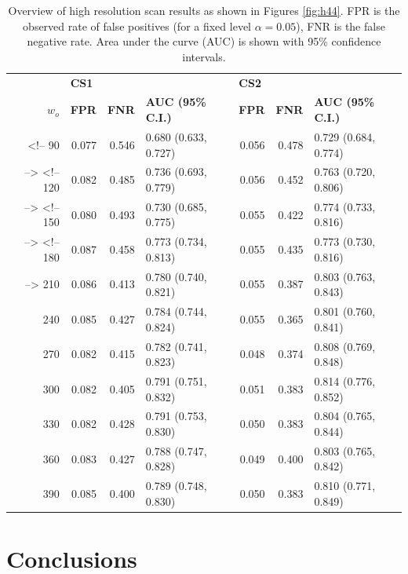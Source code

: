 \documentclass[12pt]{article}
\begin{document}
\begin{table}[hbtp]
\centering
\begin{adjustbox}{max width=\textwidth}
\begin{tabular}{rrrlrrl}
  \hline
  & \multicolumn{3}{l}{\bf CS1} & \multicolumn{3}{l}{\bf CS2} \\
$w_o$ & \bf FPR & \bf FNR & \bf AUC (95\% C.I.) & \bf FPR & \bf FNR & \bf AUC (95\% C.I.) \\  
  \hline
<!-- 90 & 0.077 & 0.546 & 0.680 (0.633, 0.727) & 0.056 & 0.478 & 0.729 (0.684, 0.774) \\  -->
<!--   120 & 0.082 & 0.485 & 0.736 (0.693, 0.779) & 0.056 & 0.452 & 0.763 (0.720, 0.806) \\  -->
<!--   150 & 0.080 & 0.493 & 0.730 (0.685, 0.775) & 0.055 & 0.422 & 0.774 (0.733, 0.816) \\  -->
<!--   180 & 0.087 & 0.458 & 0.773 (0.734, 0.813) & 0.055 & 0.435 & 0.773 (0.730, 0.816) \\  -->
  210 & 0.086 & 0.413 & 0.780 (0.740, 0.821) & 0.055 & 0.387 & 0.803 (0.763, 0.843) \\ 
  240 & 0.085 & 0.427 & 0.784 (0.744, 0.824) & 0.055 & 0.365 & 0.801 (0.760, 0.841) \\ 
  270 & 0.082 & 0.415 & 0.782 (0.741, 0.823) & 0.048 & 0.374 & 0.808 (0.769, 0.848) \\ 
  300 & 0.082 & 0.405 & 0.791 (0.751, 0.832) & 0.051 & 0.383 & 0.814 (0.776, 0.852) \\ 
  330 & 0.082 & 0.428 & 0.791 (0.753, 0.830) & 0.050 & 0.383 & 0.804 (0.765, 0.844) \\ 
  360 & 0.083 & 0.427 & 0.788 (0.747, 0.828) & 0.049 & 0.400 & 0.803 (0.765, 0.842) \\ 
  390 & 0.085 & 0.400 & 0.789 (0.748, 0.830) & 0.050 & 0.383 & 0.810 (0.771, 0.849) \\ 
   \hline
\end{tabular}
\end{adjustbox}
\caption{\label{tab:aucsh44} Overview of high resolution scan results as shown in Figures \ref{fig:h44}. FPR is the observed rate of false positives (for a fixed level $\alpha = 0.05$), FNR is the false negative rate. Area under the curve (AUC) is shown with 95\% confidence intervals. }
\end{table}

\hypertarget{conclusions}{%
\section*{Conclusions}\label{conclusions}}
\end{document}
